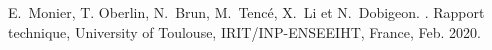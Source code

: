 \begin{fullwidth}

        E.~Monier, T. Oberlin, N.~Brun, M.~Tenc\'e, X.~Li et N.~Dobigeon.
        .
        \newblock Rapport technique, University of Toulouse, IRIT/INP-ENSEEIHT, France,
          Feb. 2020.




\end{fullwidth}